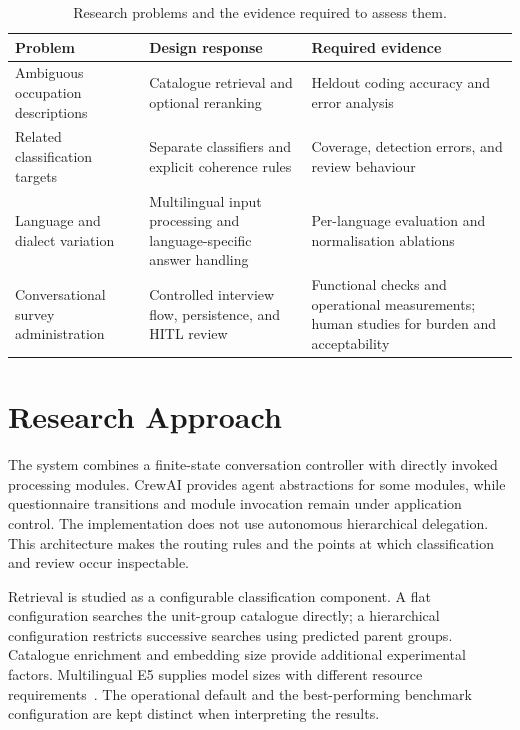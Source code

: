 \begin{table}[htbp]
\centering
\caption{Research problems and the evidence required to assess them.}
\label{tab:ch1-challenges}
\small\renewcommand{\arraystretch}{1.3}
\begin{tabular}{>{\raggedright}p{3.0cm}
                >{\raggedright}p{5.0cm}
                >{\raggedright\arraybackslash}p{4.1cm}}
\toprule
\textbf{Problem} & \textbf{Design response} & \textbf{Required evidence} \\
\midrule
Ambiguous occupation descriptions & Catalogue retrieval and optional
  reranking & Heldout coding accuracy and error analysis \\
Related classification targets & Separate classifiers and explicit
  coherence rules & Coverage, detection errors, and review behaviour \\
Language and dialect variation & Multilingual input processing and
  language-specific answer handling & Per-language evaluation and
  normalisation ablations \\
Conversational survey administration & Controlled interview flow,
  persistence, and HITL review & Functional checks and operational
  measurements; human studies for burden and acceptability \\
\bottomrule
\end{tabular}
\end{table}

\section{Research Approach}
\label{sec:opportunity}

The system combines a finite-state conversation controller with directly
invoked processing modules. CrewAI provides agent abstractions for some
modules, while questionnaire transitions and module invocation remain
under application control. The implementation does not use autonomous
hierarchical delegation. This architecture makes the routing rules and
the points at which classification and review occur inspectable.

Retrieval is studied as a configurable classification component. A flat
configuration searches the unit-group catalogue directly; a hierarchical
configuration restricts successive searches using predicted parent
groups. Catalogue enrichment and embedding size provide additional
experimental factors. Multilingual E5 supplies model sizes with different
resource requirements~\cite{wang2024multilinguale5}. The operational
default and the best-performing benchmark configuration are kept distinct
when interpreting the results.

